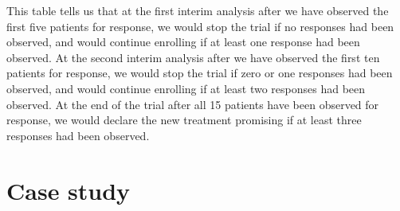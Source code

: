 This table tells us that at the first interim analysis after we have
observed the first five patients for response, we would stop the trial
if no responses had been observed, and would continue enrolling if at
least one response had been observed. At the second interim analysis
after we have observed the first ten patients for response, we would
stop the trial if zero or one responses had been observed, and would
continue enrolling if at least two responses had been observed. At the
end of the trial after all 15 patients have been observed for response,
we would declare the new treatment promising if at least three responses
had been observed.

\hypertarget{case-study}{%
\section{Case study}\label{case-study}}


